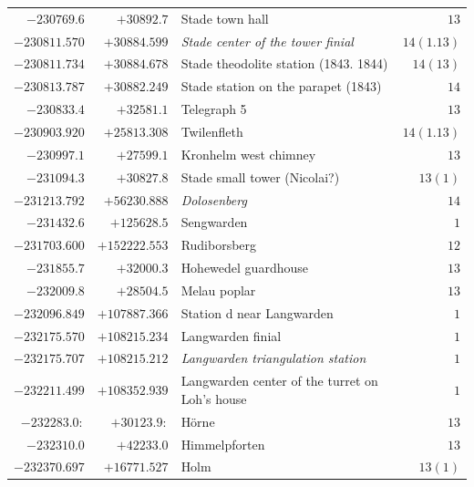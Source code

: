 \begin{center}
\begin{tabular}{r|r|p{170pt}|r}
\(-230769.6\)&\(+30892.7\)&Stade town hall&\(13\)\\
\(-230811.570\)&\(+30884.599\)&\textit{Stade center of the tower finial}&\(14(1.13)\)\\
\(-230811.734\)&\(+30884.678\)&Stade theodolite station (1843. 1844)&\(14(13)\)\\
\(-230813.787\)&\(+30882.249\)&Stade station on the parapet (1843)&\(14\)\\
\(-230833.4\)&\(+32581.1\)&Telegraph 5&\(13\)\\
\(-230903.920\)&\(+25813.308\)&Twilenfleth&\(14(1.13)\)\\
\(-230997.1\)&\(+27599.1\)&Kronhelm west chimney&\(13\)\\
\(-231094.3\)&\(+30827.8\)&Stade small tower (Nicolai?)&\(13(1)\)\\
\(-231213.792\)&\(+56230.888\)&\textit{Dolosenberg}&\(14\)\\
\(-231432.6\)&\(+125628.5\)&Sengwarden&\(1\)\\
\(-231703.600\)&\(+152222.553\)&Rudiborsberg&\(12\)\\
\(-231855.7\)&\(+32000.3\)&Hohewedel guardhouse&\(13\)\\
\(-232009.8\)&\(+28504.5\)&Melau poplar&\(13\)\\
\(-232096.849\)&\(+107887.366\)&Station d near Langwarden&\(1\)\\
\(-232175.570\)&\(+108215.234\)&Langwarden finial&\(1\)\\
\(-232175.707\)&\(+108215.212\)&\textit{Langwarden triangulation station}&\(1\)\\
\(-232211.499\)&\(+108352.939\)&Langwarden center of the turret on Loh’s house&\(1\)\\
\(-232283.0:\)&\(+30123.9:\)&Hörne&\(13\)\\
\(-232310.0\)&\(+42233.0\)&Himmelpforten&\(13\)\\
\(-232370.697\)&\(+16771.527\)&Holm&\(13(1)\)\\
\hline\end{tabular}\endgroup\end{center}
